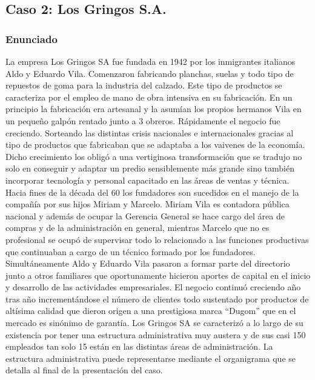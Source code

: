\documentclass[a4paper,10pt]{article}
\begin{document}
	\subsection{Caso 2: Los Gringos S.A.}
	\subsubsection{Enunciado}
	La empresa Los Gringos SA fue fundada en 1942 por los inmigrantes italianos Aldo y Eduardo Vila. Comenzaron fabricando planchas, suelas y todo tipo de repuestos de goma para la industria del calzado. Este tipo de productos se caracteriza por el empleo de mano de obra intensiva en su fabricación.\newline
	En un principio la fabricación era artesanal y la asumían los propios hermanos Vila en un pequeño galpón rentado junto a 3 obreros. Rápidamente el negocio fue creciendo. Sorteando las distintas crisis nacionales e internacionales gracias al tipo de productos que fabricaban que se adaptaba a los vaivenes de la economía.\newline
	Dicho crecimiento los obligó a una vertiginosa transformación que se tradujo no solo en conseguir y adaptar un predio sensiblemente más grande sino también incorporar tecnología y personal capacitado en las áreas de ventas y técnica.\newline
	Hacia fines de la década del 60 los fundadores son sucedidos en el manejo de la compañía por sus hijos Miriam y Marcelo.
	Miriam Vila es contadora pública nacional y además de ocupar la Gerencia General se hace cargo del área de compras y de la administración en general, mientras Marcelo que no es profesional se ocupó de supervisar todo lo relacionado a las funciones productivas que continuaban a cargo de un técnico formado por los fundadores.
	Simultáneamente Aldo y Eduardo Vila pasaron a formar parte del directorio junto a otros familiares que oportunamente hicieron aportes de capital en el inicio y desarrollo de las actividades empresariales.\newline
	El negocio continuó creciendo año tras año incrementándose el número de clientes todo sustentado por productos de altísima calidad que dieron origen a una prestigiosa marca “Dugom” que en el mercado es sinónimo de garantía.\newline
	Los Gringos SA se caracterizó a lo largo de su existencia por tener una estructura administrativa muy austera y de sus casi 150 empleados tan solo 15 están en las distintas áreas de administración. La estructura administrativa puede representarse mediante el organigrama que se detalla al final de la presentación del caso.\newline
\end{document}
